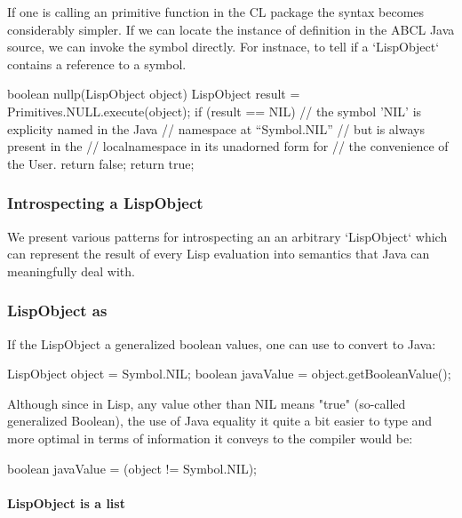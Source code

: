 \documentclass[10pt]{book}
\begin{document}
If one is calling an primitive function in the CL package the syntax
becomes considerably simpler.  If we can locate the instance of
definition in the ABCL Java source, we can invoke the symbol directly.
For instnace, to tell if a `LispObject` contains a reference to a symbol.

\begin{listing-java}
    boolean nullp(LispObject object) {
      LispObject result = Primitives.NULL.execute(object);
      if (result == NIL) { // the symbol 'NIL' is explicity named in the Java
                           // namespace at ``Symbol.NIL''
                           // but is always present in the
                           // localnamespace in its unadorned form for
                           // the convenience of the User.
        return false;
      }
      return true;
   }
\end{listing-java}

\subsubsection{Introspecting a LispObject}
\label{topic:Introspecting a LispObject}

We present various patterns for introspecting an an arbitrary
`LispObject` which can represent the result of every Lisp evaluation
into semantics that Java can meaningfully deal with.

\subsubsection{LispObject as }

If the LispObject a generalized boolean values, one can use
 to convert to Java:

\begin{listing-java}
     LispObject object = Symbol.NIL;
     boolean javaValue = object.getBooleanValue();
\end{listing-java}

Although since in Lisp, any value other than NIL means "true"
(so-called generalized Boolean), the use of Java equality it quite a
bit easier to type and more optimal in terms of information it conveys
to the compiler would be:

\begin{listing-java}
    boolean javaValue = (object != Symbol.NIL);
\end{listing-java}

\paragraph{LispObject is a list}
\end{document}
